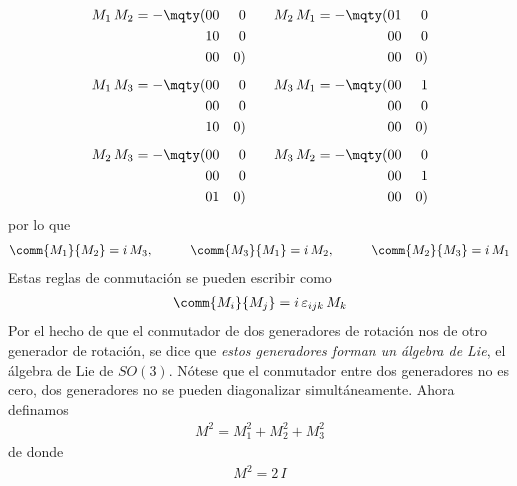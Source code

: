\begin{align}
\begin{aligned}
M_{1} \, M_{2} = - \mqty(0 & 0 & 0 \\ 1 & 0 & 0 \\ 0 & 0 & 0) \\[0.5em] 
M_{1} \, M_{3} = - \mqty(0 & 0 & 0 \\ 0 & 0 & 0 \\ 1 & 0 & 0) \\[0.5em]
M_{2} \, M_{3} = - \mqty(0 & 0 & 0 \\ 0 & 0 & 0 \\ 0 & 1 & 0)
\end{aligned}
\qquad
\begin{aligned}
M_{2} \, M_{1} = - \mqty(0 & 1 & 0 \\ 0 & 0 & 0 \\ 0 & 0 & 0) \\[0.5em]
M_{3} \, M_{1} = - \mqty(0 & 0 & 1 \\ 0 & 0 & 0 \\ 0 & 0 & 0) \\[0.5em]
M_{3} \, M_{2} = - \mqty(0 & 0 & 0 \\ 0 & 0 & 1 \\ 0 & 0 & 0)
\end{aligned}
\label{eq:ecuacion_10_081}
\end{align}
por lo que
\begin{align}
\comm{M_{1}}{M_{2}} = i \, M_{3}, \hspace{1cm} \comm{M_{3}}{M_{1}} = i \, M_{2}, \hspace{1cm} \comm{M_{2}}{M_{3}} = i \, M_{1} \label{eq:ecuacion_10_082}
\end{align}
Estas reglas de conmutación se pueden escribir como
\begin{align}
\comm{M_{i}}{M_{j}} = i \, \varepsilon_{ijk} \, M_{k}
\label{eq:ecuacion_10_083}
\end{align}
Por el hecho de que el conmutador de dos generadores de rotación nos de otro generador de rotación, se dice que \emph{estos generadores forman un álgebra de Lie}, el álgebra de Lie de $SO(3)$. Nótese que el conmutador entre dos generadores no es cero, dos generadores no se pueden diagonalizar simultáneamente. Ahora definamos
\begin{align}
M^{2} = M_{1}^{2} + M_{2}^{2} + M_{3}^{2}
\label{eq:ecuacion_10_084}
\end{align}
de donde
\begin{align}
M^{2} = 2 \, I
\label{eq:ecuacion_10_085}
\end{align}
